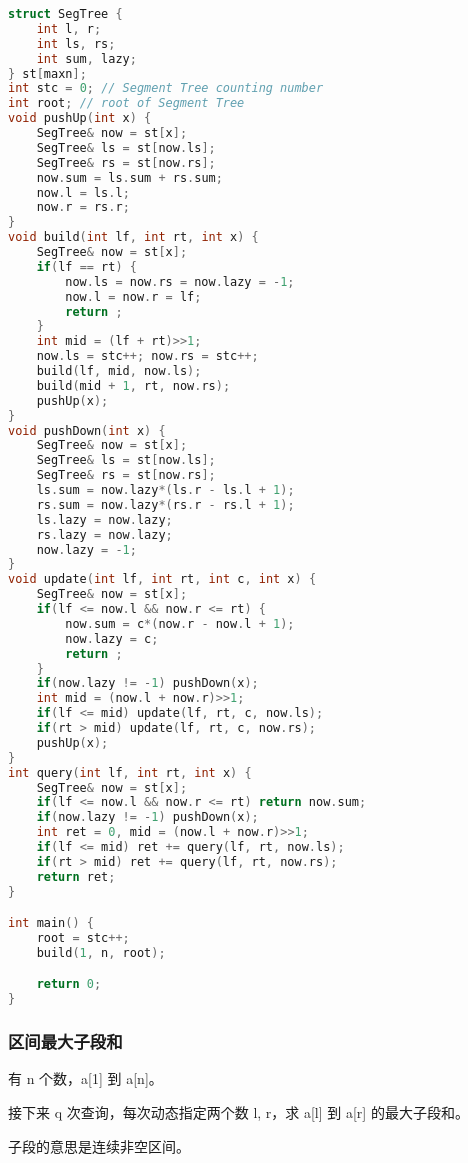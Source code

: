 \begin{lstlisting}[language=C++]
struct SegTree {
    int l, r;
    int ls, rs;
    int sum, lazy;
} st[maxn];
int stc = 0; // Segment Tree counting number
int root; // root of Segment Tree
void pushUp(int x) {
    SegTree& now = st[x];
    SegTree& ls = st[now.ls];
    SegTree& rs = st[now.rs];
    now.sum = ls.sum + rs.sum;
    now.l = ls.l;
    now.r = rs.r;
}
void build(int lf, int rt, int x) {
    SegTree& now = st[x];
    if(lf == rt) {
        now.ls = now.rs = now.lazy = -1;
        now.l = now.r = lf;
        return ;
    }
    int mid = (lf + rt)>>1;
    now.ls = stc++; now.rs = stc++;
    build(lf, mid, now.ls);
    build(mid + 1, rt, now.rs);
    pushUp(x);
}
void pushDown(int x) {
    SegTree& now = st[x];
    SegTree& ls = st[now.ls];
    SegTree& rs = st[now.rs];
    ls.sum = now.lazy*(ls.r - ls.l + 1);
    rs.sum = now.lazy*(rs.r - rs.l + 1);
    ls.lazy = now.lazy;
    rs.lazy = now.lazy;
    now.lazy = -1;
}
void update(int lf, int rt, int c, int x) {
    SegTree& now = st[x];
    if(lf <= now.l && now.r <= rt) {
        now.sum = c*(now.r - now.l + 1);
        now.lazy = c;
        return ;
    }
    if(now.lazy != -1) pushDown(x);
    int mid = (now.l + now.r)>>1;
    if(lf <= mid) update(lf, rt, c, now.ls);
    if(rt > mid) update(lf, rt, c, now.rs);
    pushUp(x);
}
int query(int lf, int rt, int x) {
    SegTree& now = st[x];
    if(lf <= now.l && now.r <= rt) return now.sum;
    if(now.lazy != -1) pushDown(x);
    int ret = 0, mid = (now.l + now.r)>>1;
    if(lf <= mid) ret += query(lf, rt, now.ls);
    if(rt > mid) ret += query(lf, rt, now.rs);
    return ret;
}

int main() {
    root = stc++;
    build(1, n, root);

    return 0;
}
\end{lstlisting}

\subsubsection{区间最大子段和}

有 n 个数，a[1] 到 a[n]。

接下来 q 次查询，每次动态指定两个数 l, r，求 a[l] 到 a[r] 的最大子段和。

子段的意思是连续非空区间。

